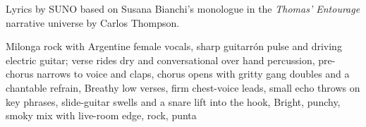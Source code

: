 
\begin{notes}
Lyrics by SUNO based on Susana Bianchi's monologue in the \emph{Thomas’ Entourage} narrative universe by Carlos Thompson.
\end{notes}
\begin{style}
Milonga rock with Argentine female vocals, sharp guitarrón pulse and driving electric guitar; verse rides dry and conversational over hand percussion, pre-chorus narrows to voice and claps, chorus opens with gritty gang doubles and a chantable refrain, Breathy low verses, firm chest-voice leads, small echo throws on key phrases, slide-guitar swells and a snare lift into the hook, Bright, punchy, smoky mix with live-room edge, rock, punta
\end{style}
